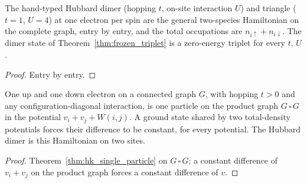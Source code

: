 \begin{theorem}
  \label{thm:bridge_hubbard}
  \leanok
  The hand-typed Hubbard dimer (hopping $t$, on-site interaction $U$) and triangle ($t=1$, $U=4$) at one electron
  per spin are the general two-species Hamiltonian on the complete graph, entry by entry, and the total occupations
  are $n_{i\uparrow}+n_{i\downarrow}$. The dimer state of Theorem~\ref{thm:frozen_triplet} is a zero-energy triplet
  for every $t$, $U$.
\end{theorem}
\begin{proof}
  \leanok
  Entry by entry.
\end{proof}

\begin{theorem}
  \label{thm:two_electron_hk}
  \leanok
  One up and one down electron on a connected graph $G$, with hopping $t>0$ and any configuration-diagonal
  interaction, is one particle on the product graph $G\,\square\,G$ in the potential $v_i+v_j+W(i,j)$. A ground state
  shared by two total-density potentials forces their difference to be constant, for every potential. The Hubbard
  dimer is this Hamiltonian on two sites.
\end{theorem}
\begin{proof}
  \leanok
  Theorem~\ref{thm:hk_single_particle} on $G\,\square\,G$; a constant difference of $v_i+v_j$ on the product graph
  forces a constant difference of $v$.
\end{proof}


